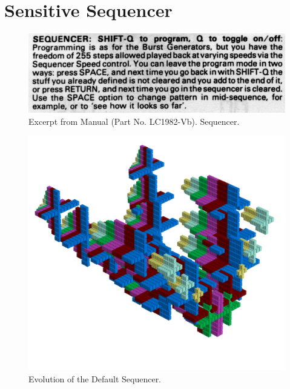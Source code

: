\chapter{Sensitive Sequencer} 
\label{sec:sequencer}
\lstset{style=6502Style}

\begin{figure}[H]
    \centering
    \begin{adjustbox}{width=10.5cm,margin=0cm}
      \includegraphics[width=12cm]{src/sequencer/sequencer.png}%
    \end{adjustbox}
    \caption{
      Excerpt from Manual (Part No. LC1982-Vb). Sequencer.
      }
\end{figure}


\clearpage                                                                 
\begin{figure}[H]                                                          
    \centering                                                             
    \begin{adjustbox}{width=14cm,center, margin= 0cm 2cm}                                   
      \includegraphics[width=14cm]{src/sequencer/pattern0-45.png}%
    \end{adjustbox}                                                        
\caption{Evolution of the Default Sequencer.}                                           
\end{figure}                                                               
\clearpage                                                                 
                                                                           
